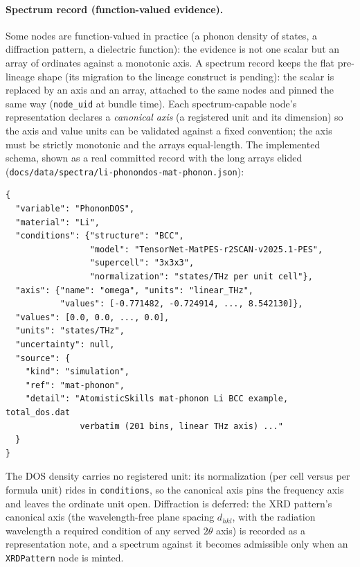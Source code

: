 \documentclass[11pt,a4paper]{article}
\begin{document}
\paragraph{Spectrum record (function-valued evidence).} Some nodes are
function-valued in practice (a phonon density of states, a diffraction pattern,
a dielectric function): the evidence is not one scalar but an array of ordinates
against a monotonic axis. A spectrum record keeps the flat pre-lineage shape
(its migration to the lineage construct is pending): the scalar is replaced by
an axis and an array, attached to the same nodes and pinned the same
way (\texttt{node\_uid} at bundle time). Each spectrum-capable node's
representation declares a \emph{canonical axis} (a registered unit and its
dimension) so the axis and value units can be validated against a fixed
convention; the axis must be strictly monotonic and the arrays equal-length.
The implemented schema, shown as a real committed record with the long arrays
elided
(\texttt{docs/data/spectra/li-phonondos-mat-phonon.json}):

\begin{verbatim}
{
  "variable": "PhononDOS",
  "material": "Li",
  "conditions": {"structure": "BCC",
                 "model": "TensorNet-MatPES-r2SCAN-v2025.1-PES",
                 "supercell": "3x3x3",
                 "normalization": "states/THz per unit cell"},
  "axis": {"name": "omega", "units": "linear_THz",
           "values": [-0.771482, -0.724914, ..., 8.542130]},
  "values": [0.0, 0.0, ..., 0.0],
  "units": "states/THz",
  "uncertainty": null,
  "source": {
    "kind": "simulation",
    "ref": "mat-phonon",
    "detail": "AtomisticSkills mat-phonon Li BCC example, total_dos.dat
               verbatim (201 bins, linear THz axis) ..."
  }
}
\end{verbatim}

The DOS density carries no registered unit: its normalization (per cell versus
per formula unit) rides in \texttt{conditions}, so the canonical axis pins the
frequency axis and leaves the ordinate unit open. Diffraction is deferred: the
XRD pattern's canonical axis (the wavelength-free plane spacing $d_{hkl}$, with
the radiation wavelength a required condition of any served $2\theta$ axis) is
recorded as a representation note, and a spectrum against it becomes admissible
only when an \texttt{XRDPattern} node is minted.
\end{document}
